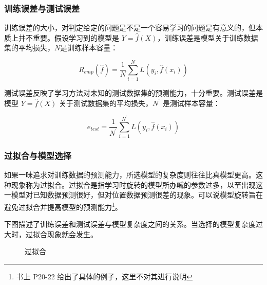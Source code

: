 \subsubsection{训练误差与测试误差}

训练误差的大小，对判定给定的问题是不是一个容易学习的问题是有意义的，但本质上并不重要。假设学习到的模型是 $Y=\hat{f}(X)$，训练误差是模型关于训练数据集的平均损失，$N$是训练样本容量：

\begin{equation}
    R_{emp}(\hat{f}) = \frac{1}{N}\sum_{i=1}^{N} L(y_i,\hat{f}(x_i))
\end{equation}

测试误差反映了学习方法对未知的测试数据集的预测能力，十分重要。测试误差是模型 $Y=\hat{f}(X)$ 关于测试数据集的平均损失，$N^{'}$ 是测试样本容量：

\begin{equation}
    e_{test} = \frac{1}{N^{'}}\sum_{i=1}^{N^{'}} L(y_i,\hat{f}(x_i))
\end{equation}


\subsubsection{过拟合与模型选择}
如果一味追求对训练数据的预测能力，所选模型的复杂度则往往比真模型更高。这种现象称为过拟合。过拟合是指学习时旋转的模型所办喊的参数过多，以至出现这一模型对已知数据预测很好，但对位置数据预测很差的现象。可以说模型旋转旨在避免过拟合并提高模型的预测能力\footnote{书上 P20-22 给出了具体的例子，这里不对其进行说明}。

下图描述了训练误差和测试误差与模型复杂度之间的关系。当选择的模型复杂度过大时，过拟合现象就会发生。

\begin{figure}[H]
    \centering
    \caption{过拟合}
\end{figure}

